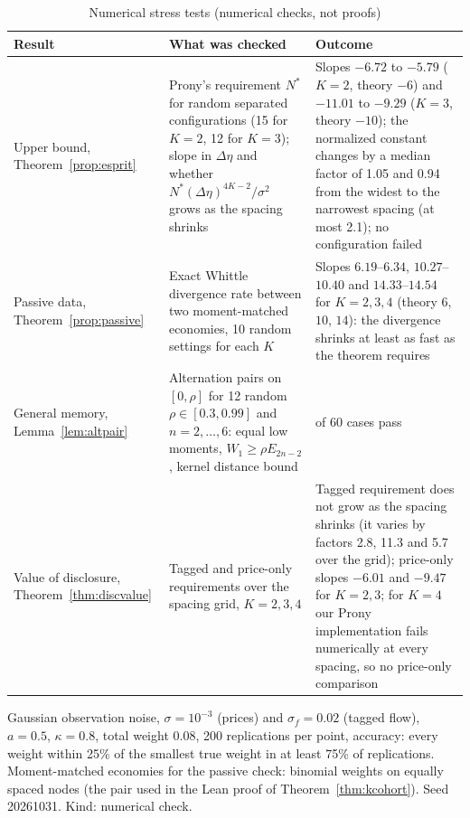 \documentclass[12pt]{article}
\theoremstyle{definition}
\theoremstyle{remark}
\begin{document}
\begin{table}[!htbp]\centering\footnotesize
\begin{threeparttable}
\caption{Numerical stress tests (numerical checks, not proofs)}\label{tab:stress}
\setlength{\tabcolsep}{3pt}
\begin{tabular}{>{\raggedright\arraybackslash}p{}>{\raggedright\arraybackslash}p{}>{\raggedright\arraybackslash}p{}}
\toprule
Result & What was checked & Outcome\\
\midrule
Upper bound, Theorem~\ref{prop:esprit} & Prony's requirement $N^*$ for random separated configurations (15 for $K=2$, 12 for $K=3$); slope in $\Delta\eta$ and whether $N^*(\Delta\eta)^{4K-2}/\sigma^2$ grows as the spacing shrinks & Slopes $-6.72$ to $-5.79$ ($K=2$, theory $-6$) and $-11.01$ to $-9.29$ ($K=3$, theory $-10$); the normalized constant changes by a median factor of 1.05 and 0.94 from the widest to the narrowest spacing (at most 2.1); no configuration failed\\
Passive data, Theorem~\ref{prop:passive} & Exact Whittle divergence rate between two moment-matched economies, 10 random settings for each $K$ & Slopes $6.19$--$6.34$, $10.27$--$10.40$ and $14.33$--$14.54$ for $K=2,3,4$ (theory $6$, $10$, $14$): the divergence shrinks at least as fast as the theorem requires\\
General memory, Lemma~\ref{lem:altpair} & Alternation pairs on $[0,\rho]$ for 12 random $\rho\in[0.3,0.99]$ and $n=2,\ldots,6$: equal low moments, $W_1\ge\rho E_{2n-2}$, kernel distance bound & 60 of 60 cases pass\\
Value of disclosure, Theorem~\ref{thm:discvalue} & Tagged and price-only requirements over the spacing grid, $K=2,3,4$ & Tagged requirement does not grow as the spacing shrinks (it varies by factors 2.8, 11.3 and 5.7 over the grid); price-only slopes $-6.01$ and $-9.47$ for $K=2,3$; for $K=4$ our Prony implementation fails numerically at every spacing, so no price-only comparison\\
\bottomrule
\end{tabular}
\begin{tablenotes}\footnotesize\item Gaussian observation noise, $\sigma=10^{-3}$ (prices) and $\sigma_f=0.02$ (tagged flow), $a=0.5$, $\kappa=0.8$, total weight $0.08$, 200 replications per point, accuracy: every weight within 25\% of the smallest true weight in at least 75\% of replications. Moment-matched economies for the passive check: binomial weights on equally spaced nodes (the pair used in the Lean proof of Theorem~\ref{thm:kcohort}). Seed 20261031. Kind: numerical check.\end{tablenotes}
\end{threeparttable}
\end{table}
\end{document}
